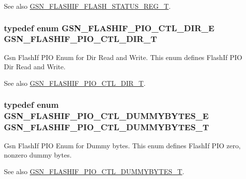 \begin{DoxySeeAlso}{See also}
\hyperlink{a00647_ga817ad96ff2f6956f431999227f67c3ca}{GSN\_\-FLASHIF\_\-FLASH\_\-STATUS\_\-REG\_\-T}. 
\end{DoxySeeAlso}
\hypertarget{a00647_gad02bc7e7274fd3ba828e7ed35c282eaf}{
\subsubsection[{GSN\_\-FLASHIF\_\-PIO\_\-CTL\_\-DIR\_\-T}]{\setlength{\rightskip}{0pt plus 5cm}typedef enum {\bf GSN\_\-FLASHIF\_\-PIO\_\-CTL\_\-DIR\_\-E}  {\bf GSN\_\-FLASHIF\_\-PIO\_\-CTL\_\-DIR\_\-T}}}
\label{a00647_gad02bc7e7274fd3ba828e7ed35c282eaf}


Gsn FlashIf PIO Enum for Dir Read and Write. This enum defines FlashIf PIO Dir Read and Write. 

\begin{DoxySeeAlso}{See also}
\hyperlink{a00647_gad02bc7e7274fd3ba828e7ed35c282eaf}{GSN\_\-FLASHIF\_\-PIO\_\-CTL\_\-DIR\_\-T}. 
\end{DoxySeeAlso}
\hypertarget{a00647_gad29e842797fae82ccad1e80f4fc97a1c}{
\subsubsection[{GSN\_\-FLASHIF\_\-PIO\_\-CTL\_\-DUMMYBYTES\_\-T}]{\setlength{\rightskip}{0pt plus 5cm}typedef enum {\bf GSN\_\-FLASHIF\_\-PIO\_\-CTL\_\-DUMMYBYTES\_\-E}  {\bf GSN\_\-FLASHIF\_\-PIO\_\-CTL\_\-DUMMYBYTES\_\-T}}}
\label{a00647_gad29e842797fae82ccad1e80f4fc97a1c}


Gsn FlashIf PIO Enum for Dummy bytes. This enum defines FlashIf PIO zero, nonzero dummy bytes. 

\begin{DoxySeeAlso}{See also}
\hyperlink{a00647_gad29e842797fae82ccad1e80f4fc97a1c}{GSN\_\-FLASHIF\_\-PIO\_\-CTL\_\-DUMMYBYTES\_\-T}. 
\end{DoxySeeAlso}


